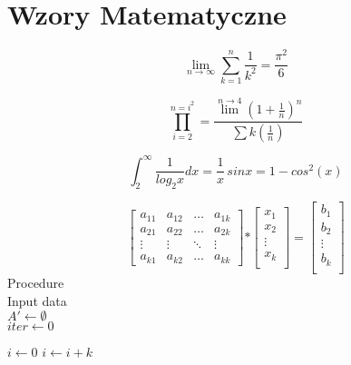 \documentclass[a4paper,12pt]{article}
\title{}
\author{Adam Rembiewski}
\begin{document}
\maketitle

\section{Wzory Matematyczne}
$$\lim_{n \to \infty}\sum_{k=1}^n \frac{1}{k^2}= \frac{\pi^2}{6}$$

$$\prod_{i=2}^{n=i^2}= \frac{\lim^{n \to 4}(1+\frac{1}{n})^n}{\sum k(\frac{1}{n})}$$

$$\int_{2}^{\infty}\frac{1}{log_{2}x}dx=\frac{1}{x}\, sinx=1-cos^2(x)$$

$$
\left[\begin{array}{cccc}
a_{11} & a_{12} & \dots & a_{1k}\\
a_{21} & a_{22} & \dots & a_{2k}\\
\vdots & \vdots & \ddots& \vdots \\
a_{k1} & a_{k2} & \dots & a_{kk}
\end{array}\right]
\mathbf *
\left[\begin{array}{c}
x_{1} \\
x_{2} \\
\vdots \\
x_{k} \\
\end{array}\right]
\mathbf =
\left[\begin{array}{c}
b_{1} \\
b_{2} \\
\vdots \\
b_{k} \\
\end{array}\right]
$$
Procedure\\
Input data\\
${A'} {\gets \emptyset}$\\
$iter \gets 0$
\begin{algorithmic}

    \State $i\gets 0$
\Else
        \State $i\gets i+k$
    \EndIf
\EndIf
\end{algorithmic}
\end{document}
